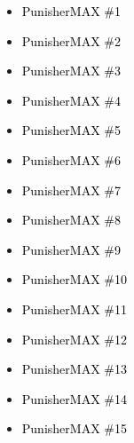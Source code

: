 \documentclass[12pt]{article}
\newcommand{\checkbox}{\raisebox{0.0ex}{\fbox{\rule{0ex}{1.5ex} \rule{1.5ex}{0ex}}}}
\begin{document}
\vspace{0.3cm}
\noindent
\begin{tcolorbox}[
  colback=white!95!gray,
  colframe=black,
  width=\textwidth,
  arc=4mm,
  auto outer arc,
  boxrule=0.8pt,
  left=8pt,right=8pt,top=8pt,bottom=8pt
]
\begin{itemize}[left=0pt,label={\checkbox}]
    \item \textcolor{black}{PunisherMAX \#1}
    \item \textcolor{black}{PunisherMAX \#2}
    \item \textcolor{black}{PunisherMAX \#3}
    \item \textcolor{black}{PunisherMAX \#4}
    \item \textcolor{black}{PunisherMAX \#5}
    \item \textcolor{black}{PunisherMAX \#6}
    \item \textcolor{black}{PunisherMAX \#7}
    \item \textcolor{black}{PunisherMAX \#8}
    \item \textcolor{black}{PunisherMAX \#9}
    \item \textcolor{black}{PunisherMAX \#10}
    \item \textcolor{black}{PunisherMAX \#11}
    \item \textcolor{black}{PunisherMAX \#12}
    \item \textcolor{black}{PunisherMAX \#13}
    \item \textcolor{black}{PunisherMAX \#14}
    \item \textcolor{black}{PunisherMAX \#15}
\end{itemize}
\end{tcolorbox}

\newpage
{}
\end{document}
